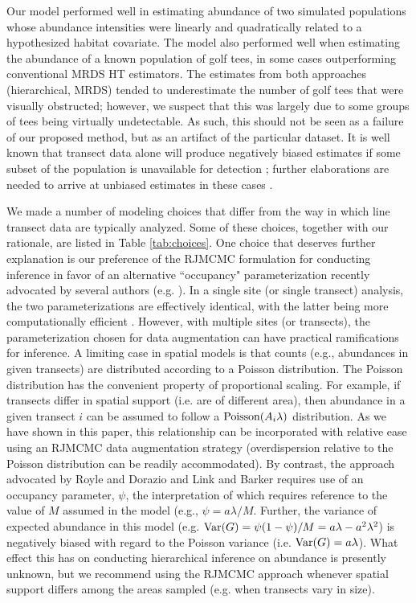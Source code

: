 \documentclass[10pt]{article}
\begin{document}
Our model performed well in estimating abundance of two simulated populations whose abundance intensities were linearly and quadratically related to a hypothesized habitat covariate.  The model also performed well when estimating the abundance of a known population of golf tees, in some cases outperforming conventional MRDS HT estimators.  The estimates from both approaches (hierarchical, MRDS) tended to underestimate the number of golf tees that were visually obstructed; however, we suspect that this was largely due to some groups of tees being virtually undetectable.  As such, this should not be seen as a failure of our proposed method, but as an artifact of the particular dataset.  It is well known that transect data alone will produce negatively biased estimates if some subset of the population is unavailable for detection \cite{McLaren1961}; further elaborations are needed to arrive at unbiased estimates in these cases \cite{Marsh1989,Bengtson2005,DiefenbachEtAl2007}.

We made a number of modeling choices that differ from the way in which line transect data are typically analyzed. Some of these choices, together with our rationale, are listed in Table \ref{tab:choices}.  One choice that deserves further explanation is our preference of the RJMCMC formulation for conducting inference in favor of an alternative ``occupancy" parameterization recently advocated by several authors (e.g. \cite{RoyleDorazio2008,LinkBarker2010}).  In a single site (or single transect) analysis, the two parameterizations are effectively identical, with the latter being more computationally efficient \cite{LinkBarker2010}.  However, with multiple sites (or transects), the parameterization chosen for data augmentation can have practical ramifications for inference.  A limiting case in spatial models is that counts (e.g., abundances in given transects) are distributed according to a Poisson distribution.  The Poisson distribution has the convenient property of proportional scaling.  For example, if transects differ in spatial support (i.e. are of different area), then abundance in a given transect $i$ can be assumed to follow a ${\rm Poisson}(A_i\lambda)$ distribution.  As we have shown in this paper, this relationship can be incorporated with relative ease using an RJMCMC data augmentation strategy (overdispersion relative to the Poisson distribution can be readily accommodated). By contrast, the approach advocated by Royle and Dorazio \cite{RoyleDorazio2008} and Link and Barker \cite{LinkBarker2010} requires use of an occupancy parameter, $\psi$, the interpretation of which requires reference to the value of $M$ assumed in the model (e.g., $\psi=a\lambda/M$.  Further, the variance of expected abundance in this model (e.g. ${\rm Var}(G)=\psi (1-\psi)/M = a\lambda-a^2\lambda^2$) is negatively biased with regard to the Poisson variance (i.e. ${\rm Var}(G)=a\lambda$).  What effect this has on conducting hierarchical inference on abundance is presently unknown, but we recommend using the RJMCMC approach whenever spatial support differs among the areas sampled (e.g. when transects vary in size).
\end{document}
